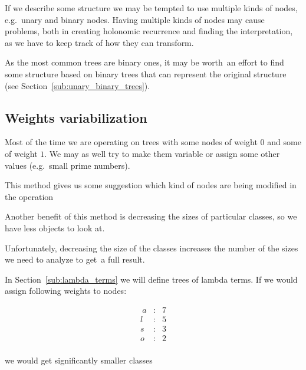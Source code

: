 \documentclass[final]{article}
\theoremstyle{definition}
\theoremstyle{definition}
\theoremstyle{remark}
\begin{document}
If we describe some structure we may be tempted to use multiple kinds of nodes, e.g.~unary and binary nodes. Having multiple kinds of nodes may cause problems, both in creating holonomic recurrence and finding the interpretation, as we have to keep track of how they can transform.

As the most common trees are binary ones, it may be worth~an effort to find some structure based on binary trees that can represent the original structure (see Section~\ref{sub:unary_binary_trees}).

\subsection{Weights variabilization}%
\label{sub:weights_variablization}

Most of the time we are operating on trees with some nodes of weight \(0\) and some of weight \(1\). We may as well try to make them variable or assign some other values (e.g.~small prime numbers).

This method gives us some suggestion which kind of nodes are being modified in the operation

Another benefit of this method is decreasing the sizes of particular classes, so we have less objects to look at.

Unfortunately, decreasing the size of the classes increases the number of the sizes we need to analyze to get~a full result.

In Section~\ref{sub:lambda_terms} we will define trees of lambda terms. If we would assign following weights to nodes:

\[\begin{array}{rcl}
       ~a &:& 7\\
        l &:& 5\\
        s &:& 3\\
        o &:& 2\\
\end{array}\]

we would get significantly smaller classes
\end{document}
